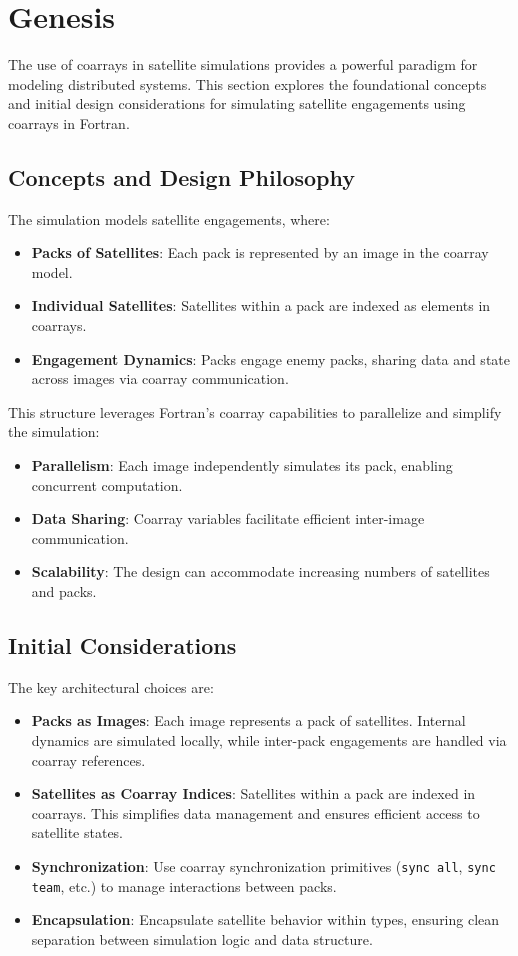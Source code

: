 
\section{Genesis}

The use of coarrays in satellite simulations provides a powerful paradigm for modeling distributed systems. This section explores the foundational concepts and initial design considerations for simulating satellite engagements using coarrays in Fortran.

\subsection{Concepts and Design Philosophy}

The simulation models satellite engagements, where:
\begin{itemize}
    \item \textbf{Packs of Satellites}: Each pack is represented by an image in the coarray model.
    \item \textbf{Individual Satellites}: Satellites within a pack are indexed as elements in coarrays.
    \item \textbf{Engagement Dynamics}: Packs engage enemy packs, sharing data and state across images via coarray communication.
\end{itemize}

This structure leverages Fortran’s coarray capabilities to parallelize and simplify the simulation:
\begin{itemize}
    \item \textbf{Parallelism}: Each image independently simulates its pack, enabling concurrent computation.
    \item \textbf{Data Sharing}: Coarray variables facilitate efficient inter-image communication.
    \item \textbf{Scalability}: The design can accommodate increasing numbers of satellites and packs.
\end{itemize}

\subsection{Initial Considerations}

The key architectural choices are:
\begin{itemize}
    \item \textbf{Packs as Images}:
        Each image represents a pack of satellites. Internal dynamics are simulated locally, while inter-pack engagements are handled via coarray references.
    \item \textbf{Satellites as Coarray Indices}:
        Satellites within a pack are indexed in coarrays. This simplifies data management and ensures efficient access to satellite states.
    \item \textbf{Synchronization}:
        Use coarray synchronization primitives (\texttt{sync all}, \texttt{sync team}, etc.) to manage interactions between packs.
    \item \textbf{Encapsulation}:
        Encapsulate satellite behavior within types, ensuring clean separation between simulation logic and data structure.
\end{itemize}

